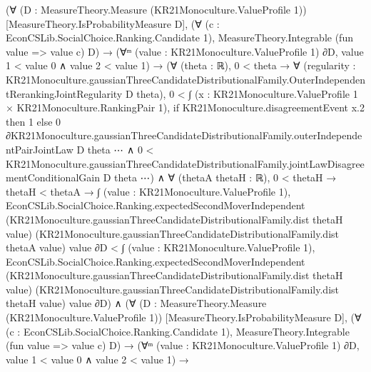 \documentclass[10pt]{article}
\begin{document}
\begin{ReviewVerbatim}
            (∀ (D : MeasureTheory.Measure (KR21Monoculture.ValueProfile 1)) [MeasureTheory.IsProbabilityMeasure D],
                (∀ (c : EconCSLib.SocialChoice.Ranking.Candidate 1),
                    MeasureTheory.Integrable (fun value => value c) D) →
                  (∀ᵐ (value : KR21Monoculture.ValueProfile 1) ∂D, value 1 < value 0 ∧ value 2 < value 1) →
                    (∀ (theta : ℝ),
                        0 < theta →
                          ∀
                            (regularity :
                              KR21Monoculture.gaussianThreeCandidateDistributionalFamily.OuterIndependentRerankingJointRegularity
                                D theta),
                            0 <
                                ∫ (x : KR21Monoculture.ValueProfile 1 × KR21Monoculture.RankingPair 1),
                                  if KR21Monoculture.disagreementEvent x.2 then 1
                                  else
                                    0 ∂KR21Monoculture.gaussianThreeCandidateDistributionalFamily.outerIndependentPairJointLaw
                                    D theta ⋯ ∧
                              0 <
                                KR21Monoculture.gaussianThreeCandidateDistributionalFamily.jointLawDisagreementConditionalGain
                                  D theta ⋯) ∧
                      ∀ (thetaA thetaH : ℝ),
                        0 < thetaH →
                          thetaH < thetaA →
                            ∫ (value : KR21Monoculture.ValueProfile 1),
                                EconCSLib.SocialChoice.Ranking.expectedSecondMoverIndependent
                                  (KR21Monoculture.gaussianThreeCandidateDistributionalFamily.dist thetaH value)
                                  (KR21Monoculture.gaussianThreeCandidateDistributionalFamily.dist thetaA value)
                                  value ∂D <
                              ∫ (value : KR21Monoculture.ValueProfile 1),
                                EconCSLib.SocialChoice.Ranking.expectedSecondMoverIndependent
                                  (KR21Monoculture.gaussianThreeCandidateDistributionalFamily.dist thetaH value)
                                  (KR21Monoculture.gaussianThreeCandidateDistributionalFamily.dist thetaH value)
                                  value ∂D) ∧
              (∀ (D : MeasureTheory.Measure (KR21Monoculture.ValueProfile 1)) [MeasureTheory.IsProbabilityMeasure D],
                  (∀ (c : EconCSLib.SocialChoice.Ranking.Candidate 1),
                      MeasureTheory.Integrable (fun value => value c) D) →
                    (∀ᵐ (value : KR21Monoculture.ValueProfile 1) ∂D, value 1 < value 0 ∧ value 2 < value 1) →

\end{ReviewVerbatim}
\end{document}

